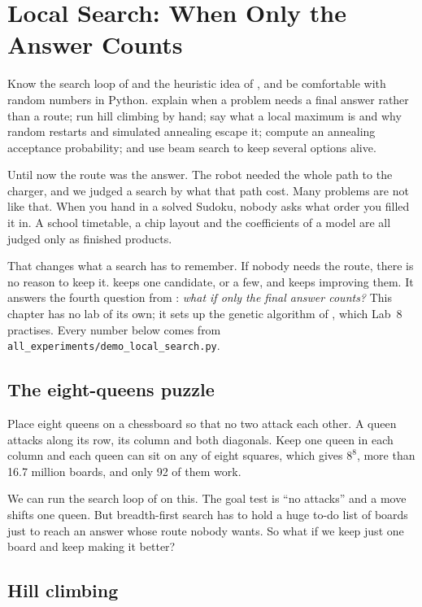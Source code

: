 \chapter{Local Search: When Only the Answer Counts}
\label{ch:localsearch}

\chapterguide%
  {Know the search loop of  and the heuristic idea of , and be comfortable with random numbers in Python.}
  {explain when a problem needs a final answer rather than a route; run hill climbing by hand; say what a local maximum is and why random restarts and simulated annealing escape it; compute an annealing acceptance probability; and use beam search to keep several options alive.}

Until now the route was the answer. The robot needed the whole path to the charger, and we judged a search by what that path cost. Many problems are not like that. When you hand in a solved Sudoku, nobody asks what order you filled it in. A school timetable, a chip layout and the coefficients of a model are all judged only as finished products.

That changes what a search has to remember. If nobody needs the route, there is no reason to keep it.  keeps one candidate, or a few, and keeps improving them. It answers the fourth question from : \emph{what if only the final answer counts?} This chapter has no lab of its own; it sets up the genetic algorithm of , which Lab~8 practises. Every number below comes from \texttt{all\_experiments/demo\_local\_search.py}.

\section{The eight-queens puzzle}

Place eight queens on a chessboard so that no two attack each other. A queen attacks along its row, its column and both diagonals. Keep one queen in each column and each queen can sit on any of eight squares, which gives $8^8$, more than 16.7 million boards, and only 92 of them work.

We can run the search loop of  on this. The goal test is ``no attacks'' and a move shifts one queen. But breadth-first search has to hold a huge to-do list of boards just to reach an answer whose route nobody wants. So what if we keep just one board and keep making it better?

\section{Hill climbing}

